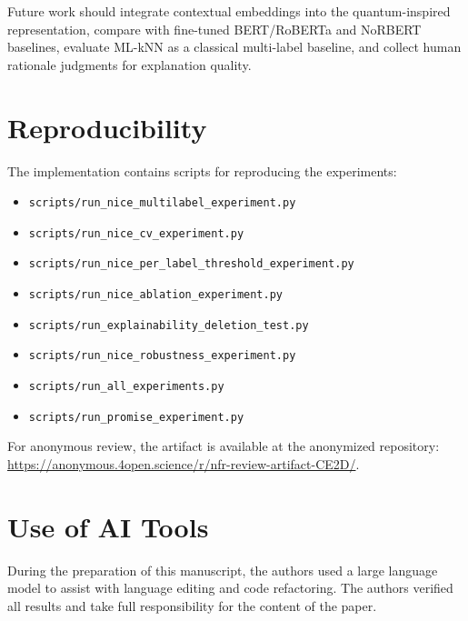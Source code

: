 \documentclass[runningheads]{llncs}
\begin{document}
Future work should integrate contextual embeddings into the quantum-inspired
representation, compare with fine-tuned BERT/RoBERTa \cite{liu2019roberta} and
NoRBERT baselines, evaluate ML-kNN \cite{zhang2007mlknn} as a classical
multi-label baseline, and collect human rationale judgments for explanation
quality.

\section*{Reproducibility}
The implementation contains scripts for reproducing the experiments:
\begin{itemize}
    \item \texttt{scripts/run\_nice\_multilabel\_experiment.py}
    \item \texttt{scripts/run\_nice\_cv\_experiment.py}
    \item \texttt{scripts/run\_nice\_per\_label\_threshold\_experiment.py}
    \item \texttt{scripts/run\_nice\_ablation\_experiment.py}
    \item \texttt{scripts/run\_explainability\_deletion\_test.py}
    \item \texttt{scripts/run\_nice\_robustness\_experiment.py}
    \item \texttt{scripts/run\_all\_experiments.py}
    \item \texttt{scripts/run\_promise\_experiment.py}
\end{itemize}
For anonymous review, the artifact is available at the anonymized repository:
\url{https://anonymous.4open.science/r/nfr-review-artifact-CE2D/}.

\section*{Use of AI Tools}
During the preparation of this manuscript, the authors used a large language
model to assist with language editing and code refactoring. The authors verified
all results and take full responsibility for the content of the paper.



\end{document}

